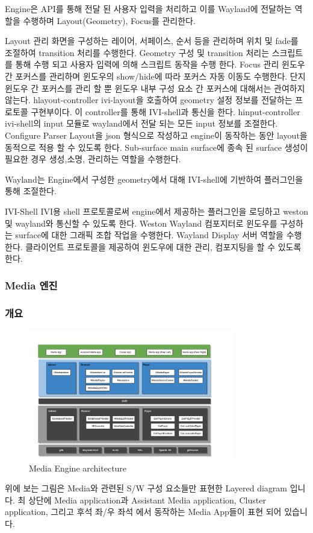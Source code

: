 Engine은 API를 통해 전달 된 사용자 입력을 처리하고 이를 Wayland에 전달하는 역할을 수행하며 Layout(Geometry), Focus를 관리한다.

    Layout 관리
        화면을 구성하는 레이어, 서페이스, 순서 등을 관리하며 위치 및 fade를 조절하여 transition 처리를 수행한다. Geometry 구성 및 transition 처리는 스크립트를 통해 수행 되고 사용자 입력에 의해 스크립트 동작을 수행 한다.
    Focus 관리
        윈도우 간 포커스를 관리하며 윈도우의 show/hide에 따라 포커스 자동 이동도 수행한다. 단지 윈도우 간 포커스를 관리 할 뿐 윈도우 내부 구성 요소 간 포커스에 대해서는 관여하지 않는다.
    hlayout-controller
        ivi-layout을 호출하여 geometry 설정 정보를 전달하는 프로토콜 구현부이다. 이 controller를 통해 IVI-shell과 통신을 한다.
    hinput-controller
        ivi-shell의 input 모듈로 wayland에서 전달 되는 모든 input 정보를 조절한다.
    Configure Parser
        Layout을 json 형식으로 작성하고 engine이 동작하는 동안 layout을 동적으로 적용 할 수 있도록 한다.
    Sub-surface
        main surface에 종속 된 surface 생성이 필요한 경우 생성,소명, 관리하는 역할을 수행한다.

Wayland는 Engine에서 구성한 geometry에서 대해 IVI-shell에 기반하여 플러그인을 통해 조절한다.

    IVI-Shell
        IVI용 shell 프로토콜로써 engine에서 제공하는 플러그인을 로딩하고 weston 및 wayland와 통신할 수 있도록 한다.
    Weston
        Wayland 컴포지터로 윈도우를 구성하는 surface에 대한 그래픽 조합 작업을 수행한다.
    Wayland
        Display 서버 역할을 수행한다. 클라이언트 프로토콜을 제공하여 윈도우에 대한 관리, 컴포지팅을 할 수 있도록 한다.



\subsubsection{Media 엔진}
\subsubsection*{개요}
\begin{figure}[h]
\centering
\includegraphics[width=0.8\textwidth]{fig/media_engine.png}
\caption{Media Engine architecture}
\end{figure}
위에 보는 그림은 Media와 관련된 S/W 구성 요소들만 표현한 Layered diagram 입니다. 최 상단에 Media application과 Assistant Media application, Cluster application, 그리고 후석 좌/우 좌석 에서 동작하는 Media App들이 표현 되어 있습니다.

